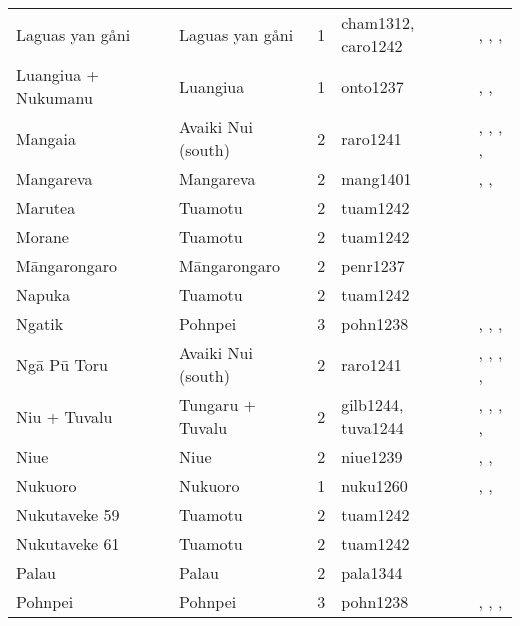 \begin{longtable}{p{4.5cm}p{2cm}p{2cm}p{2cm}p{4cm}}
  Laguas yan gåni & Laguas yan gåni & 1 & cham1312, caro1242 & \citet{cordy1983social}, \citet{thompson_1971}, \citet{josephandmurray1951}, \citet{spehr1954} \\ 
  Luangiua + Nukumanu & Luangiua & 1 & onto1237 & \citet{sahlins1958social}, \citet{bayliss1974constraints}, \citet{donner1991} \\ 
  Mangaia & Avaiki Nui (south) & 2 & raro1241 & \citet{bellwood1971varieties}, \citet{buck1934}, \citet{crocombe_1967}, \citet{hayes1981cook}, \citet{walter1996} \\ 
  Mangareva & Mangareva & 2 & mang1401 & \citet{buck1938}, \citet{conte2004archaeological}, \citet{green2000mangarevan} \\ 
  Marutea & Tuamotu & 2 & tuam1242 & \citet{emory1975material} \\ 
  Morane & Tuamotu & 2 & tuam1242 & \citet{emory1975material} \\ 
  Māngarongaro & Māngarongaro & 2 & penr1237 & \citet{buck1932b} \\ 
  Napuka & Tuamotu & 2 & tuam1242 & \citet{emory1975material} \\ 
  Ngatik & Pohnpei & 3 & pohn1238 & \citet{hanlon2019upon}, \citet{haun1984prehistoric}, \citet{raynor1991indigenous}, \citet{riesenberg1968native} \\ 
  Ngā Pū Toru & Avaiki Nui (south) & 2 & raro1241 & \citet{bellwood1971varieties}, \citet{buck1934}, \citet{crocombe_1967}, \citet{hayes1981cook}, \citet{walter1996} \\ 
  Niu + Tuvalu & Tungaru + Tuvalu & 2 & gilb1244, tuva1244 & \citet{lambert1966}, \citet{lambert1975makin}, \citet{lambert1991}, \citet{macdonald1982cinderellas}, \citet{goldsmith1991} \\ 
  Niue & Niue & 2 & niue1239 & \citet{loeb1978}, \citet{smith1983niue}, \citet{walter_anderson1995} \\ 
  Nukuoro & Nukuoro & 1 & nuku1260 & \citet{carroll1966nukuoro}, \citet{carroll1975pacific}, \citet{eilers_1934} \\ 
  Nukutaveke 59 & Tuamotu & 2 & tuam1242 & \citet{emory1975material} \\ 
  Nukutaveke 61 & Tuamotu & 2 & tuam1242 & \citet{emory1975material} \\ 
  Palau & Palau & 2 & pala1344 & \citet{force1960leadership} \\ 
  Pohnpei & Pohnpei & 3 & pohn1238 & \citet{hanlon2019upon}, \citet{haun1984prehistoric}, \citet{raynor1991indigenous}, \citet{riesenberg1968native} \\ 

\end{longtable}
